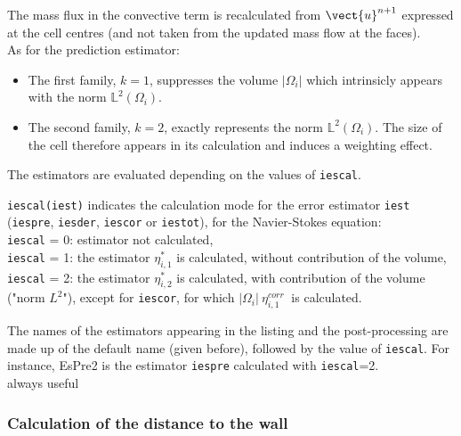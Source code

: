 The mass flux in the convective term is recalculated from $\vect{u}^{n+1}$
expressed at the cell centres (and not taken from the updated mass flow at the
faces).\\

As for the prediction estimator:
\begin{itemize}
\item The first family, $k=1$, suppresses the
volume $|\Omega_i|$ which intrinsicly appears  with the norm
${\mathbb{L}^{2}(\Omega_i)}$.
\item The second family, $k=2$, exactly represents the norm
${\mathbb{L}^{2}(\Omega_i)}$. The size of the cell therefore
appears in its calculation and induces a weighting effect.
\end{itemize}

The estimators are evaluated depending on the values of {\tt iescal}.


{{\tt iescal(iest)} indicates the calculation mode
for the error estimator {\tt iest} ({\tt iespre}, {\tt iesder}, {\tt iescor} or
{\tt iestot}), for
the Navier-Stokes equation:\\
 {\tt iescal} = 0: estimator not calculated, \\
 {\tt iescal} = 1: the estimator $ \eta^{*}_{i,1}$ is calculated,
                   without contribution of the volume, \\
 {\tt iescal} = 2: the estimator $ \eta^{*}_{i,2}$ is calculated,
                   with contribution of the volume ("norm $L^2$"),
                   except for {\tt iescor}, for which
                   $|\Omega_i|\ \eta^{corr}_{i,1}\ $
                   is calculated.

The names of the estimators appearing in the listing and the post-processing are
made up of the default name (given before), followed by the value of
{\tt iescal}. For
instance, EsPre2 is the estimator {\tt iespre} calculated with {\tt iescal}=2.\\
always useful}


\subsubsection{Calculation of the distance to the wall}

